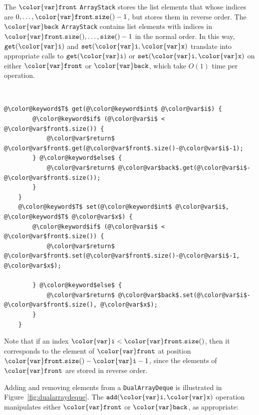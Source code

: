 \documentclass[10pt]{book}
\newcommand{\figref}[1]{Figure~\ref{fig:#1}}
\theoremstyle{plain}
\theoremstyle{definition}
\begin{document}
The \ensuremath{\mathtt{{\color{var}front}}} \texttt{ArrayStack} stores the list elements that whose indices
are $0,\ldots,\ensuremath{\mathtt{{\color{var}front}.size()}}-1$, but stores them in reverse order.
The \ensuremath{\mathtt{{\color{var}back}}} \texttt{ArrayStack} contains list elements with indices
in $\ensuremath{\mathtt{{\color{var}front}.size()}},\ldots,\ensuremath{\mathtt{size()}}-1$ in the normal order.  In this way,
\ensuremath{\mathtt{get({\color{var}i})}} and \ensuremath{\mathtt{set({\color{var}i},{\color{var}x})}} translate into appropriate calls to \ensuremath{\mathtt{get({\color{var}i})}}
or \ensuremath{\mathtt{set({\color{var}i},{\color{var}x})}} on either \ensuremath{\mathtt{{\color{var}front}}} or \ensuremath{\mathtt{{\color{var}back}}}, which take $O(1)$ time per operation.



 \ \vspace{.5ex}\begin{Verbatim}[gobble=1,tabsize=2,frame=single,framerule=1.2pt,commandchars=\\@\$,label=\texttt{DualArrayDeque},labelposition=topline]
	@\color@keyword$T$ get(@\color@keyword$int$ @\color@var$i$) {
		@\color@keyword$if$ (@\color@var$i$ < @\color@var$front$.size()) {
			@\color@var$return$ @\color@var$front$.get(@\color@var$front$.size()-@\color@var$i$-1);
		} @\color@keyword$else$ {
			@\color@var$return$ @\color@var$back$.get(@\color@var$i$-@\color@var$front$.size());
		}
	}
	@\color@keyword$T$ set(@\color@keyword$int$ @\color@var$i$, @\color@keyword$T$ @\color@var$x$) {
		@\color@keyword$if$ (@\color@var$i$ < @\color@var$front$.size()) {
			@\color@var$return$ @\color@var$front$.set(@\color@var$front$.size()-@\color@var$i$-1, @\color@var$x$);
			
		} @\color@keyword$else$ {
			@\color@var$return$ @\color@var$back$.set(@\color@var$i$-@\color@var$front$.size(), @\color@var$x$);
		}
	}
\end{Verbatim}


Note that if an index $\ensuremath{\mathtt{{\color{var}i}}}<\ensuremath{\mathtt{{\color{var}front}.size()}}$, then it corresponds to the
element of \ensuremath{\mathtt{{\color{var}front}}} at position $\ensuremath{\mathtt{{\color{var}front}.size()}}-\ensuremath{\mathtt{{\color{var}i}}}-1$, since the
elements of \ensuremath{\mathtt{{\color{var}front}}} are stored in reverse order.

Adding and removing elements from a \texttt{DualArrayDeque} is illustrated in
\figref{dualarraydeque}.  The \ensuremath{\mathtt{add({\color{var}i},{\color{var}x})}} operation manipulates either \ensuremath{\mathtt{{\color{var}front}}}
or \ensuremath{\mathtt{{\color{var}back}}}, as appropriate:
\end{document}
